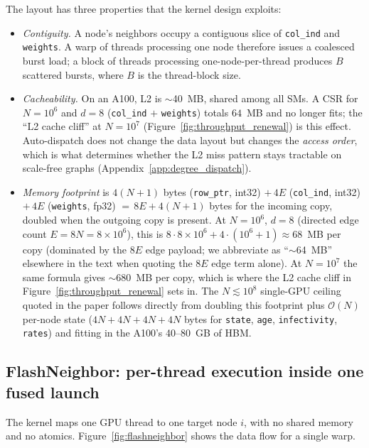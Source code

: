 \documentclass[a4paper,fleqn]{cas-sc}
\theoremstyle{definition}
\theoremstyle{remark}
\newcommand{\bigO}{\mathcal{O}}
\begin{document}
The layout has three properties that the kernel design exploits:
\begin{itemize}
\item \emph{Contiguity.} A node's neighbors occupy a contiguous slice of \texttt{col\_ind} and \texttt{weights}. A warp of threads processing one node therefore issues a coalesced burst load; a block of threads processing one-node-per-thread produces $B$ scattered bursts, where $B$ is the thread-block size.
\item \emph{Cacheability.} On an A100, L2 is $\sim$40~MB, shared among all SMs. A CSR for $N = 10^6$ and $d = 8$ (\texttt{col\_ind} $+$ \texttt{weights}) totals $64$~MB and no longer fits; the ``L2 cache cliff'' at $N = 10^7$ (Figure~\ref{fig:throughput_renewal}) is this effect. Auto-dispatch does not change the data layout but changes the \emph{access order}, which is what determines whether the L2 miss pattern stays tractable on scale-free graphs (Appendix~\ref{app:degree_dispatch}).
\item \emph{Memory footprint} is $4(N{+}1)$ bytes (\texttt{row\_ptr}, int32) $+\,4E$ (\texttt{col\_ind}, int32) $+\,4E$ (\texttt{weights}, fp32) $=\,8E + 4(N{+}1)$ bytes for the incoming copy, doubled when the outgoing copy is present. At $N = 10^6$, $d = 8$ (directed edge count $E = 8N = 8 \times 10^6$), this is $8 \cdot 8 \times 10^6 + 4 \cdot (10^6{+}1) \approx 68$~MB per copy (dominated by the $8E$ edge payload; we abbreviate as ``$\sim$64~MB'' elsewhere in the text when quoting the $8E$ edge term alone). At $N = 10^7$ the same formula gives $\sim$680~MB per copy, which is where the L2 cache cliff in Figure~\ref{fig:throughput_renewal} sets in. The $N \lesssim 10^8$ single-GPU ceiling quoted in the paper follows directly from doubling this footprint plus $\bigO(N)$ per-node state ($4N + 4N + 4N + 4N$ bytes for \texttt{state}, \texttt{age}, \texttt{infectivity}, \texttt{rates}) and fitting in the A100's 40--80~GB of HBM.
\end{itemize}

\subsection{FlashNeighbor: per-thread execution inside one fused launch}
\label{app:flashneighbor}

The kernel maps one GPU thread to one target node $i$, with no shared memory and no atomics. Figure~\ref{fig:flashneighbor} shows the data flow for a single warp.
\end{document}
